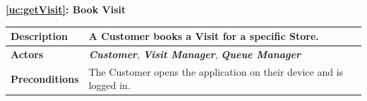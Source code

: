\documentclass[a4paper, 12pt, oneside]{article}
\begin{document}
\begin{center}
{\textbf{\ref{uc:getVisit}: Book Visit}}
\end{center}
\begin{tabularx}{\linewidth}{| l | X |}
    
    \hline
    \textbf{Description} & A Customer books a Visit for a specific Store.\\
    

    \hline
    \textbf{Actors} & \textbf{\textit{Customer}}, \textbf{\textit{Visit Manager}}, \textit{\textbf{Queue Manager}}\\
    
    \hline
    \textbf{Preconditions} & The Customer opens the application on their device and is logged in.\\
    

\end{tabularx}
\end{document}
